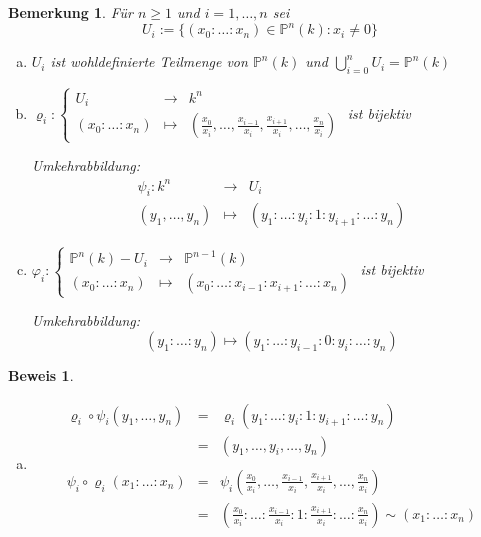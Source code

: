 \documentclass[a4paper, 12pt, numbers=noendperiod, chapterprefix=true]{scrbook}
\theoremstyle{break}
\newtheorem{Bem}[Def]{Bemerkung}
\theoremstyle{nonumberbreak}
\newtheorem{Bew}{Beweis}
\theoremstyle{nonumberplain}
\newcommand{\IP}{\mathbb{P}}%
\begin{document}
\begin{Bem}
F\"ur $n\ge1$ und $i=1,\dots ,n$ sei
	\[U_i:=\{ (x_0:\ldots :x_n)\in \IP^n(k):x_i\not=0\}\]
\begin{enumerate}[a)]
\item
	$U_i$ ist wohldefinierte Teilmenge von $\IP^n(k)$ und $\bigcup\limits_{i=0}^n U_i=\IP^n(k)$

\item
	$\varrho_i: \left\{ \begin{array}{rcl}
		U_i &\to& k^n\\
		(x_0:\ldots :x_n) &\mapsto& (\frac{x_0}{x_i}, \dots ,\frac{x_{i-1}}{x_i}, \frac{x_{i+1}}{x_i}, \dots , \frac{x_n}{x_i})
	\end{array} \right.$ ist bijektiv
	
	Umkehrabbildung:
		\[\begin{array}{rcl} 
			\psi_i:k^n &\to& U_i\\
			(y_1,\dots , y_n) &\mapsto& (y_1:\ldots: y_i :1:y_{i+1}:\ldots:y_n)
		\end{array}\]
		
\item
	$\varphi_i: \left\{ \begin{array}{rcl}
		\IP^n(k)-U_i &\to& \IP^{n-1}(k)\\
		(x_0:\ldots :x_n) &\mapsto& (x_0: \ldots: x_{i-1}: x_{i+1}: \ldots: x_n)
	\end{array} \right.$ ist bijektiv
	
	Umkehrabbildung:
		\[ (y_1: \ldots: y_n) \mapsto (y_1:\ldots:y_{i-1}:0:y_i:\ldots:y_n)\]
\end{enumerate}\end{Bem}

\begin{Bew}\begin{enumerate}[a)]\item[b)]
\[\begin{array}{rcl}
	\varrho_i\circ\psi_i(y_1,\dots ,y_n) &=&\varrho_i(y_1:\ldots:y_i:1:y_{i+1}:\ldots:y_n )\\
	&=& (y_1,\dots ,y_i,\dots ,y_n)\\ &&\\
	\psi_i\circ\varrho_i(x_1:\ldots:x_n)  &=& \psi_i(\frac{x_0}{x_i},\dots ,\frac{x_{i-1}}{x_i},\frac{x_{i+1}}{x_i},\dots ,\frac{x_n}{x_i})\\
	&=& (\frac{x_0}{x_i}:\ldots :\frac{x_{i-1}}{x_i}:1:\frac{x_{i+1}}{x_i}:\ldots :\frac{x_n}{x_i})\sim(x_1:\ldots:x_n )
\end{array}\]
\end{enumerate}\end{Bew}
\end{document}
